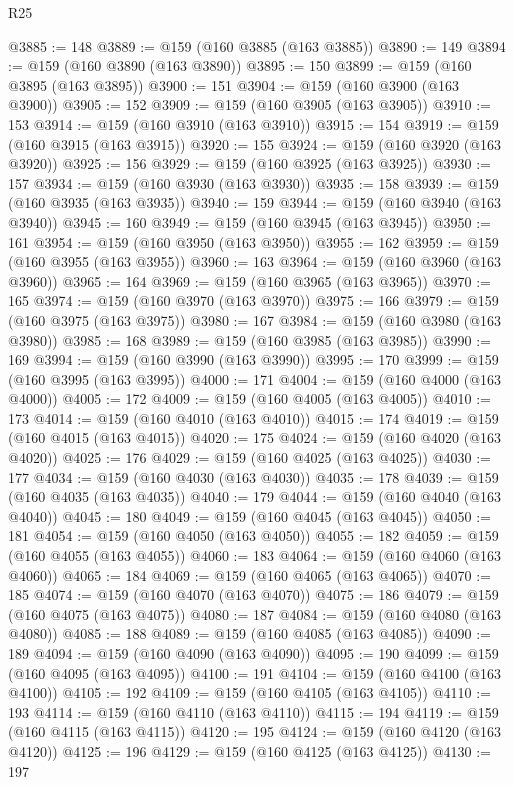 \begin{lexlean}{R25}
\begin{coremodule}
@3885 := 148
@3889 := @159 (@160 @3885 (@163 @3885))
@3890 := 149
@3894 := @159 (@160 @3890 (@163 @3890))
@3895 := 150
@3899 := @159 (@160 @3895 (@163 @3895))
@3900 := 151
@3904 := @159 (@160 @3900 (@163 @3900))
@3905 := 152
@3909 := @159 (@160 @3905 (@163 @3905))
@3910 := 153
@3914 := @159 (@160 @3910 (@163 @3910))
@3915 := 154
@3919 := @159 (@160 @3915 (@163 @3915))
@3920 := 155
@3924 := @159 (@160 @3920 (@163 @3920))
@3925 := 156
@3929 := @159 (@160 @3925 (@163 @3925))
@3930 := 157
@3934 := @159 (@160 @3930 (@163 @3930))
@3935 := 158
@3939 := @159 (@160 @3935 (@163 @3935))
@3940 := 159
@3944 := @159 (@160 @3940 (@163 @3940))
@3945 := 160
@3949 := @159 (@160 @3945 (@163 @3945))
@3950 := 161
@3954 := @159 (@160 @3950 (@163 @3950))
@3955 := 162
@3959 := @159 (@160 @3955 (@163 @3955))
@3960 := 163
@3964 := @159 (@160 @3960 (@163 @3960))
@3965 := 164
@3969 := @159 (@160 @3965 (@163 @3965))
@3970 := 165
@3974 := @159 (@160 @3970 (@163 @3970))
@3975 := 166
@3979 := @159 (@160 @3975 (@163 @3975))
@3980 := 167
@3984 := @159 (@160 @3980 (@163 @3980))
@3985 := 168
@3989 := @159 (@160 @3985 (@163 @3985))
@3990 := 169
@3994 := @159 (@160 @3990 (@163 @3990))
@3995 := 170
@3999 := @159 (@160 @3995 (@163 @3995))
@4000 := 171
@4004 := @159 (@160 @4000 (@163 @4000))
@4005 := 172
@4009 := @159 (@160 @4005 (@163 @4005))
@4010 := 173
@4014 := @159 (@160 @4010 (@163 @4010))
@4015 := 174
@4019 := @159 (@160 @4015 (@163 @4015))
@4020 := 175
@4024 := @159 (@160 @4020 (@163 @4020))
@4025 := 176
@4029 := @159 (@160 @4025 (@163 @4025))
@4030 := 177
@4034 := @159 (@160 @4030 (@163 @4030))
@4035 := 178
@4039 := @159 (@160 @4035 (@163 @4035))
@4040 := 179
@4044 := @159 (@160 @4040 (@163 @4040))
@4045 := 180
@4049 := @159 (@160 @4045 (@163 @4045))
@4050 := 181
@4054 := @159 (@160 @4050 (@163 @4050))
@4055 := 182
@4059 := @159 (@160 @4055 (@163 @4055))
@4060 := 183
@4064 := @159 (@160 @4060 (@163 @4060))
@4065 := 184
@4069 := @159 (@160 @4065 (@163 @4065))
@4070 := 185
@4074 := @159 (@160 @4070 (@163 @4070))
@4075 := 186
@4079 := @159 (@160 @4075 (@163 @4075))
@4080 := 187
@4084 := @159 (@160 @4080 (@163 @4080))
@4085 := 188
@4089 := @159 (@160 @4085 (@163 @4085))
@4090 := 189
@4094 := @159 (@160 @4090 (@163 @4090))
@4095 := 190
@4099 := @159 (@160 @4095 (@163 @4095))
@4100 := 191
@4104 := @159 (@160 @4100 (@163 @4100))
@4105 := 192
@4109 := @159 (@160 @4105 (@163 @4105))
@4110 := 193
@4114 := @159 (@160 @4110 (@163 @4110))
@4115 := 194
@4119 := @159 (@160 @4115 (@163 @4115))
@4120 := 195
@4124 := @159 (@160 @4120 (@163 @4120))
@4125 := 196
@4129 := @159 (@160 @4125 (@163 @4125))
@4130 := 197

\end{coremodule}
\end{lexlean}
